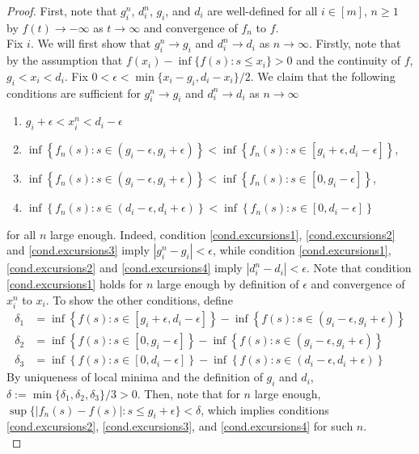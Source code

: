 \begin{proof}
First, note that $g_i^n$, $d_i^n$, $g_i$, and $d_i$ are well-defined for all $i\in [m]$, $n\geq 1$ by $f(t)\to -\infty$ as $t\to \infty$ and convergence of $f_n$ to $f$. \\
Fix $i$. We will first show that $g^n_i\to g_i$ and $d_i^n\to d_i$ as $n\to \infty$. Firstly, note that by the assumption that $f(x_i)-\inf\{f(s):s\leq x_i\}>0$ and the continuity of $f$, $g_i<x_i<d_i$. Fix $0<\epsilon<\min\{x_i-g_i,d_i-x_i\}/2$. We claim that the following conditions are sufficient for $g^n_i\to g_i$ and $d_i^n\to d_i$ as $n\to \infty$
\begin{enumerate}
    \item \label{cond.excursions1} $g_i+\epsilon<x^n_i<d_i-\epsilon$
    \item \label{cond.excursions2}$\inf\left\{f_n(s):s\in (g_i-\epsilon, g_i+\epsilon)\right\}<\inf\left\{f_n(s):s\in [g_i+\epsilon,d_i-\epsilon] \right\}$, 
    \item \label{cond.excursions3}$\inf\left\{f_n(s):s\in (g_i-\epsilon, g_i+\epsilon)\right\}<\inf\left\{f_n(s):s\in [0,g_i-\epsilon]\right\}$,
    \item \label{cond.excursions4} $\inf\left\{ f_n(s):s\in (d_i-\epsilon,d_i+\epsilon)\right\}<\inf\left\{f_n(s):s\in [0,d_i-\epsilon]\right\}$
\end{enumerate}
for all $n$ large enough. Indeed, condition \ref{cond.excursions1}, \ref{cond.excursions2} and \ref{cond.excursions3} imply $|g^n_i-g_i|<\epsilon$, while condition \ref{cond.excursions1}, \ref{cond.excursions2} and \ref{cond.excursions4} imply $|d^n_i-d_i|<\epsilon$. Note that condition \ref{cond.excursions1} holds for $n$ large enough by definition of $\epsilon$ and convergence of $x_i^n$ to $x_i$. To show the other conditions, define
\begin{align*}\delta_1&=\inf\left\{f(s):s\in [g_i+\epsilon,d_i-\epsilon]\right\}-\inf\left\{f(s):s\in (g_i-\epsilon,g_i+\epsilon)\right\}\\
\delta_2&=\inf\left\{f(s):s\in [0,g_i-\epsilon]\right\}-\inf\left\{f(s):s\in (g_i-\epsilon,g_i+\epsilon)\right\}\\
\delta_3&=\inf\left\{f(s):s\in [0,d_i-\epsilon]\right\}-\inf\left\{f(s):s\in (d_i-\epsilon,d_i+\epsilon)\right\}
\end{align*}
By uniqueness of local minima and the definition of $g_i$ and $d_i$,  $\delta:=\min\{\delta_1,\delta_2,\delta_3\}/3>0$. Then, note that for $n$ large enough, $\sup\{|f_n(s)-f(s)|:s\leq g_i+\epsilon\}<\delta$, which implies conditions \ref{cond.excursions2}, \ref{cond.excursions3}, and \ref{cond.excursions4} for such $n$. \\

\end{proof}
